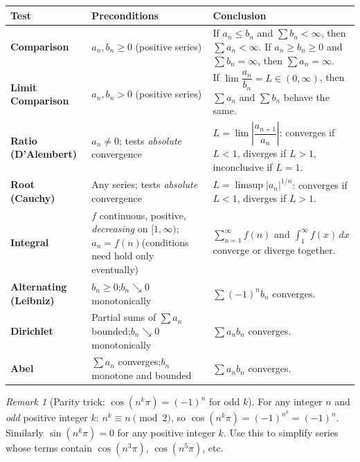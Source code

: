 \documentclass[12pt, a4paper]{article}
\theoremstyle{definition}
\theoremstyle{remark}
\newtheorem*{remark}{Remark}
\begin{document}
\begin{center}
\begin{tabular}{>{\bfseries}p{2.8cm}p{4.5cm}p{5.5cm}}
\toprule
Test & Preconditions & Conclusion \\
\midrule
Comparison
  & $a_n, b_n \ge 0$ \newline (positive series)
  & If $a_n \le b_n$ and $\sum b_n<\infty$, then $\sum a_n <\infty$.
    If $a_n \ge b_n \ge 0$ and $\sum b_n=\infty$, then $\sum a_n=\infty$. \\[6pt]
Limit Comparison
  & $a_n, b_n > 0$ \newline (positive series)
  & If $\lim\dfrac{a_n}{b_n} = L \in (0,\infty)$, then $\sum a_n$ and $\sum b_n$ behave the same. \\[6pt]
Ratio (D'Alembert)
  & $a_n \ne 0$; tests \emph{absolute} convergence
  & $L = \lim\!\left|\dfrac{a_{n+1}}{a_n}\right|$: converges if $L<1$, diverges if $L>1$, inconclusive if $L=1$. \\[6pt]
Root (Cauchy)
  & Any series; tests \emph{absolute} convergence
  & $L = \limsup|a_n|^{1/n}$: converges if $L<1$, diverges if $L>1$. \\[6pt]
Integral
  & $f$ continuous, positive, \emph{decreasing} on $[1,\infty)$;\newline $a_n = f(n)$\newline (conditions need hold only eventually)
  & $\sum_{n=1}^\infty f(n)$ and $\int_1^\infty\! f(x)\,dx$ converge or diverge together. \\[6pt]
Alternating (Leibniz)
  & $b_n \ge 0$;\newline $b_n \searrow 0$ monotonically
  & $\sum(-1)^n b_n$ converges. \\[6pt]
Dirichlet
  & Partial sums of $\sum a_n$ bounded;\newline $b_n \searrow 0$ monotonically
  & $\sum a_n b_n$ converges. \\[6pt]
Abel
  & $\sum a_n$ converges;\newline $b_n$ monotone and bounded
  & $\sum a_n b_n$ converges. \\
\bottomrule
\end{tabular}
\end{center}

\begin{remark}[Parity trick: $\cos(n^k\pi) = (-1)^n$ for odd $k$]
For any integer $n$ and \emph{odd} positive integer $k$: $n^k \equiv n \pmod{2}$, so
$\cos(n^k\pi) = (-1)^{n^k} = (-1)^n$.
Similarly $\sin(n^k\pi) = 0$ for any positive integer $k$.
Use this to simplify series whose terms contain $\cos(n^3\pi)$, $\cos(n^5\pi)$, etc.
\end{remark}
\end{document}
